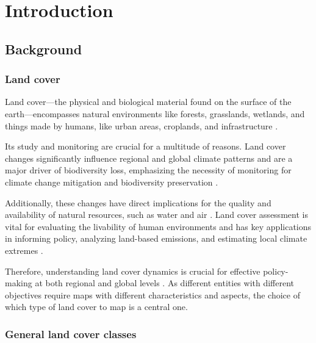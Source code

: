 \chapter[Introduction]{Introduction}
\label{cha:Chapter1}
\vspace*{\fill}


\newpage

\section{Background}

\subsection{Land cover}

    Land cover---the physical and biological material found on the surface of the earth---encompasses natural environments like forests, grasslands, wetlands, and things made by humans, like urban areas, croplands, and infrastructure \citep{fisher2005land}. 
    
    Its study and monitoring are crucial for a multitude of reasons. Land cover changes significantly influence regional and global climate patterns and are a major driver of biodiversity loss, emphasizing the necessity of monitoring for climate change mitigation and biodiversity preservation \citep{pielke2002influence, houghton2012carbon, sala2000global, cbd2016indicators}. 
    
    Additionally, these changes have direct implications for the quality and availability of natural resources, such as water and air \citep{foley2005global}. Land cover assessment is vital for evaluating the livability of human environments \citep{krekel2016greener,levering2024landscape} and has key applications in informing policy, analyzing land-based emissions, and estimating local climate extremes \citep{duveiller2020, hong2021luemissions, sy2020,}. 

    Therefore, understanding land cover dynamics is crucial for effective policy-making at both regional and global levels \citep{liu2020assessing, trisurat2019land, shumba2020effectiveness}. As different entities with different objectives require maps with different characteristics and aspects, the choice of which type of land cover to map is a central one. 

\subsection{General land cover classes}

